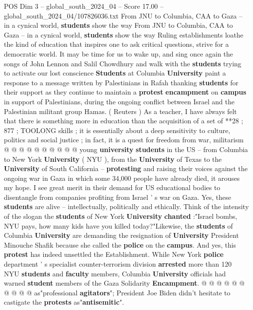\begin{textsample}{POS Dim 3 – global\_south\_2024\_04 – Score 17.00 – global\_south\_2024\_04/107826036.txt}  \label{ex:f3_pos_217}
From JNU to Columbia, CAA to Gaza -- in a cynical world, \textbf{students} show the way From JNU to Columbia, CAA to Gaza -- in a cynical world, \textbf{students} show the way Ruling establishments loathe the kind of education that inspires one to ask critical questions, strive for a democratic world.
It may be time for us to wake up, and sing once again the songs of John Lennon and Salil Chowdhury and walk with the \textbf{students} trying to activate our lost conscience \textbf{Students} at Columbia \textbf{University} paint a response to a message written by Palestinians in Rafah thanking \textbf{students} for their support as they continue to maintain a \textbf{protest} \textbf{encampment} on \textbf{campus} in support of Palestinians, during the ongoing conflict between Israel and the Palestinian militant group Hamas. ( Reuters ) As a teacher, I have always felt that there is something more in education than the acquisition of a set of **28 ; 877 ; TOOLONG skills ; it is essentially about a deep sensitivity to culture, politics and social justice ; in fact, it is a quest for freedom from war, militarism @ @ @ @ @ @ @ @ @ @ young \textbf{university} \textbf{students} in the US -- from Columbia to New York \textbf{University} ( NYU ), from the \textbf{University} of Texas to the \textbf{University} of South California -- \textbf{protesting} and raising their voices against the ongoing war in Gaza in which some 34,000 people have already died, it arouses my hope.
I see great merit in their demand for US educational bodies to disentangle from companies profiting from Israel ' s war on Gaza.
Yes, these \textbf{students} are alive -- intellectually, politically and ethically.
Think of the intensity of the slogan the \textbf{students} of New York \textbf{University} \textbf{chanted} :"Israel bombs, NYU pays, how many kids have you killed today?"Likewise, the \textbf{students} of Columbia \textbf{University} are demanding the resignation of \textbf{University} President Minouche Shafik because she called the \textbf{police} on the \textbf{campus}.
And yes, this \textbf{protest} has indeed unsettled the Establishment.
While New York \textbf{police} department ' s specialist counter-terrorism division \textbf{arrested} more than 120 NYU \textbf{students} and \textbf{faculty} members, Columbia \textbf{University} officials had warned \textbf{student} members of the Gaza Solidarity \textbf{Encampment}. @ @ @ @ @ @ @ @ @ @ as"professional \textbf{agitators}"; President Joe Biden didn't hesitate to castigate the \textbf{protests} as"\textbf{antisemitic}".

\end{textsample}
